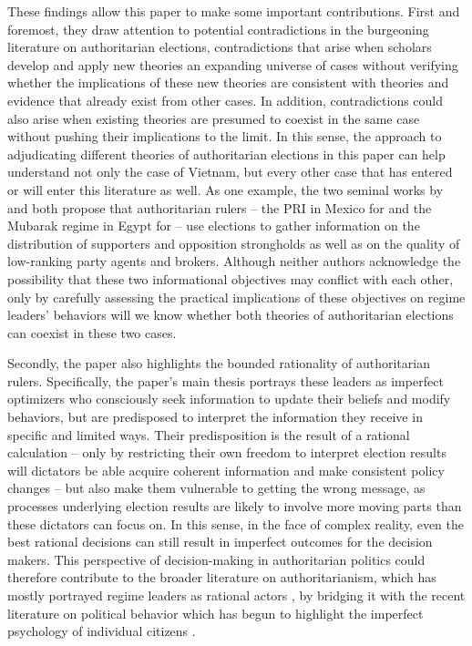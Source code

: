 \documentclass[12pt]{article}
\newcommand{\1}{\mathbbm{1}}
\begin{document}
These findings allow this paper to make some important contributions. First and foremost, they draw attention to potential contradictions in the burgeoning literature on authoritarian elections, contradictions that arise when scholars develop and apply new theories an expanding universe of cases without verifying whether the implications of these new theories are consistent with theories and evidence that already exist from other cases. In addition, contradictions could also arise when existing theories are presumed to coexist in the same case without pushing their implications to the limit. In this sense, the approach to adjudicating different theories of authoritarian elections in this paper can help understand not only the case of Vietnam, but every other case that has entered or will enter this literature as well. As one example, the two seminal works by \cite{Magaloni2006} and \cite{Blaydes2008} both propose that authoritarian rulers -- the PRI in Mexico for \cite{Magaloni2006} and the Mubarak regime in Egypt for \cite{Blaydes2008} -- use elections to gather information on the distribution of supporters and opposition strongholds as well as on the quality of low-ranking party agents and brokers. Although neither authors acknowledge the possibility that these two informational objectives may conflict with each other, only by carefully assessing the practical implications of these objectives on regime leaders' behaviors will we know whether both theories of authoritarian elections can coexist in these two cases.

Secondly, the paper also highlights the bounded rationality of authoritarian rulers. Specifically, the paper's main thesis portrays these leaders as imperfect optimizers who consciously seek information to update their beliefs and modify behaviors, but are predisposed to interpret the information they receive in specific and limited ways. Their predisposition is the result of a rational calculation -- only by restricting their own freedom to interpret election results will dictators be able acquire coherent information and make consistent policy changes -- but also make them vulnerable to getting the wrong message, as processes underlying election results are likely to involve more moving parts than these dictators can focus on. In this sense, in the face of complex reality, even the best rational decisions can still result in imperfect outcomes for the decision makers. This perspective of decision-making in authoritarian politics could therefore contribute to the broader literature on authoritarianism, which has mostly portrayed regime leaders as rational actors \citep[e.g.][]{AR2001}, by bridging it with the recent literature on political behavior which has begun to highlight the imperfect psychology of individual citizens \citep[e.g.][]{AchenBartels2016}. 
\end{document}
